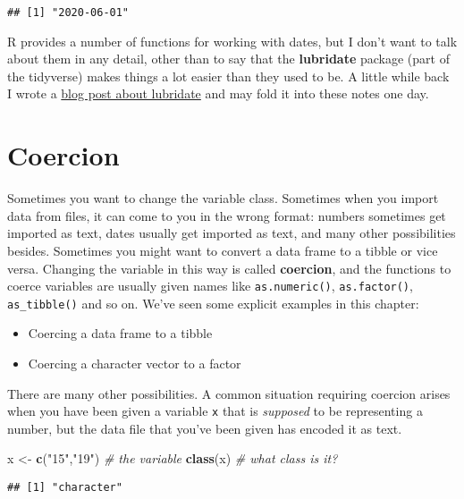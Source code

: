\documentclass[]{book}
\newenvironment{Shaded}{\begin{snugshade}}{\end{snugshade}}
\newcommand{\CommentTok}[1]{\textcolor[rgb]{0.56,0.35,0.01}{\textit{#1}}}
\newcommand{\KeywordTok}[1]{\textcolor[rgb]{0.13,0.29,0.53}{\textbf{#1}}}
\newcommand{\NormalTok}[1]{#1}
\newcommand{\StringTok}[1]{\textcolor[rgb]{0.31,0.60,0.02}{#1}}
\providecommand{\tightlist}{%
  \setlength{\itemsep}{0pt}\setlength{\parskip}{0pt}}
\begin{document}
\begin{verbatim}
## [1] "2020-06-01"
\end{verbatim}

R provides a number of functions for working with dates, but I don't want to talk about them in any detail, other than to say that the \textbf{lubridate} package (part of the tidyverse) makes things a lot easier than they used to be. A little while back I wrote a \href{http://djnavarro.net/post/2018-05-02-lubridate/}{blog post about lubridate} and may fold it into these notes one day.

\hypertarget{coercion}{%
\section{Coercion}\label{coercion}}

Sometimes you want to change the variable class. Sometimes when you import data from files, it can come to you in the wrong format: numbers sometimes get imported as text, dates usually get imported as text, and many other possibilities besides. Sometimes you might want to convert a data frame to a tibble or vice versa. Changing the variable in this way is called \textbf{coercion}, and the functions to coerce variables are usually given names like \texttt{as.numeric()}, \texttt{as.factor()}, \texttt{as\_tibble()} and so on. We've seen some explicit examples in this chapter:

\begin{itemize}
\tightlist
\item
  Coercing a data frame to a tibble
\item
  Coercing a character vector to a factor
\end{itemize}

There are many other possibilities. A common situation requiring coercion arises when you have been given a variable \texttt{x} that is \emph{supposed} to be representing a number, but the data file that you've been given has encoded it as text.

\begin{Shaded}
\begin{Highlighting}[]
\NormalTok{x <-}\StringTok{ }\KeywordTok{c}\NormalTok{(}\StringTok{"15"}\NormalTok{,}\StringTok{"19"}\NormalTok{)  }\CommentTok{# the variable}
\KeywordTok{class}\NormalTok{(x)           }\CommentTok{# what class is it?}
\end{Highlighting}
\end{Shaded}

\begin{verbatim}
## [1] "character"
\end{verbatim}
\end{document}
